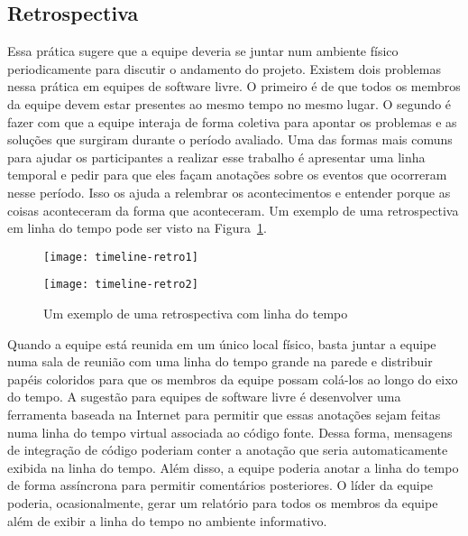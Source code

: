 \subsection{Retrospectiva}
\label{subsec:retrospect}

Essa prática sugere que a equipe deveria se juntar num ambiente físico
periodicamente para discutir o andamento do projeto. Existem dois
problemas nessa prática em equipes de software livre. O primeiro é de
que todos os membros da equipe devem estar presentes ao mesmo tempo no
mesmo lugar. O segundo é fazer com que a equipe interaja de forma
coletiva para apontar os problemas e as soluções que surgiram durante
o período avaliado. Uma das formas mais comuns para ajudar os
participantes a realizar esse trabalho é apresentar uma linha temporal
e pedir para que eles façam anotações sobre os eventos que ocorreram
nesse período. Isso os ajuda a relembrar os acontecimentos e entender
porque as coisas aconteceram da forma que aconteceram. Um exemplo de
uma retrospectiva em linha do tempo pode ser visto na
Figura~\ref{fig:timelineretro}.



\begin{figure}[htb]
  \begin{minipage}[t]{0.5\linewidth}
    \centering
    \texttt{[image: timeline-retro1]}
  \end{minipage}
  \begin{minipage}[t]{0.5\linewidth}
    \centering
    \texttt{[image: timeline-retro2]}
  \end{minipage}
  \caption{Um exemplo de uma retrospectiva com linha do tempo}
  \label{fig:timelineretro}
\end{figure}

Quando a equipe está reunida em um único local físico, basta juntar a
equipe numa sala de reunião com uma linha do tempo grande na parede e
distribuir papéis coloridos para que os membros da equipe possam
colá-los ao longo do eixo do tempo. A sugestão para equipes de
software livre é desenvolver uma ferramenta baseada na Internet para
permitir que essas anotações sejam feitas numa linha do tempo virtual
associada ao código fonte. Dessa forma, mensagens de integração de
código poderiam conter a anotação que seria automaticamente exibida na
linha do tempo. Além disso, a equipe poderia anotar a linha do tempo
de forma assíncrona para permitir comentários posteriores. O líder da
equipe poderia, ocasionalmente, gerar um relatório para todos os membros
da equipe além de exibir a linha do tempo no ambiente informativo.


